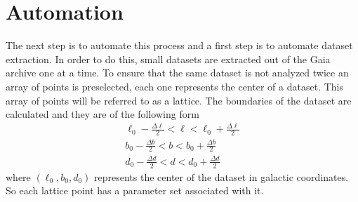 \documentclass[12pt]{amsart}
\newcommand{\comment}[1]{}
\begin{document}
\comment{
An Important Note on Search Queries
An important note before continuing: within the searching language of the Gaia archive (ADQL) if we requested a cube by the constraints,
\begin{align}
	x_{min}<x<x_{max}\\
	y_{min}<y<y_{max}\\
	z_{min}<z<z_{max}
\end{align},\\
this would take a long time and would likely time out. This is because the search engine is going through every data point in the Gaia catalog and performing calculations to covert spherical coordinates into cartesian. A way to improve the speed of the search would be to first apply constraints on b, and l to drastically cut down the amount of calculations that need to be performed. A good way to do this would be to constrain b and l so that the cube barely fits within these constraints and perhaps 2 corners touch the constraints as shown in figure (?)




Image





Thus, a better query for this stellar stream would be,

\begin{align}
	l_{min}<l<l_{max}\\
	 b_{min}<b<b_{max}\\
	x_{min}<x<x_{max}\\
	y_{min}<y<y_{max}\\
	z_{min}<z<z_{max}.
\end{align}
}





\section*{Automation }
	The next step is to automate this process and a first step is to automate dataset extraction. In order to do this, small datasets are extracted out of the Gaia archive one at a time. To ensure that the same dataset is not analyzed twice an array of points is preselected, each one represents the center of a dataset. This array of points will be referred to as a lattice. The boundaries of the dataset are calculated and they are of the following form
\begin{align}
\ell_0 - \frac{\Delta \ell}{2} < \ell < \ell_0 + \frac{\Delta \ell}{2}\\
b_0 - \frac{\Delta b}{2} < b < b_0 + \frac{\Delta b}{2}\\ 
d_0 - \frac{\Delta d}{2} < d < d_0 + \frac{\Delta d}{2}
\end{align}
where $(\ell_0,b_0,d_0)$ represents the center of the dataset in galactic coordinates. So each lattice point has a parameter set associated with it.
	
\end{document}
